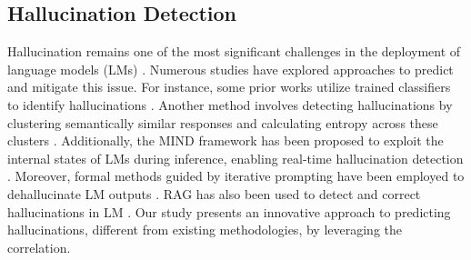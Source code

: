 \subsection{Hallucination Detection}

Hallucination remains one of the most significant challenges in the deployment of language models (LMs) \cite{zhang2023sirenssongaiocean, Huang_2024}. Numerous studies have explored approaches to predict and mitigate this issue. For instance, some prior works utilize trained classifiers to identify hallucinations \cite{jiang2024largelanguagemodelshallucination, quevedo2024detectinghallucinationslargelanguage, chen2024hallucinationdetectionrobustlydiscerning}. Another method involves detecting hallucinations by clustering semantically similar responses and calculating entropy across these clusters \cite{farquhar2024detecting}. Additionally, the MIND framework has been proposed to exploit the internal states of LMs during inference, enabling real-time hallucination detection \cite{su2024unsupervisedrealtimehallucinationdetection}. Moreover, formal methods guided by iterative prompting have been employed to dehallucinate LM outputs \cite{jha2023dehallucinating}. RAG has also been used to detect and correct hallucinations in LM \cite{mishra2024finegrainedhallucinationdetectionediting}. Our study presents an innovative approach to predicting hallucinations, different from existing methodologies, by leveraging the correlation.